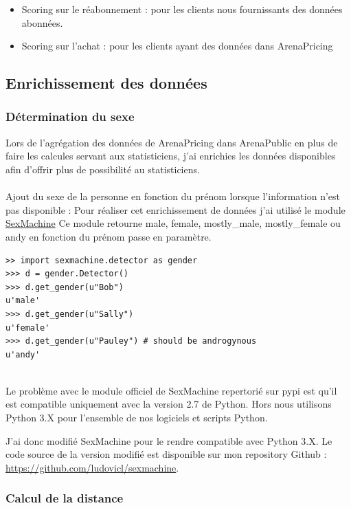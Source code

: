\begin{itemize}
  \item[\textbullet] Scoring sur le réabonnement : pour les clients nous fournissants des données abonnées. 
  \item[\textbullet] Scoring sur l'achat : pour les clients ayant des données dans ArenaPricing  
\end{itemize} 

\subsection{Enrichissement des données}
\subsubsection{Détermination du sexe}

Lors de l'agrégation des données de ArenaPricing dans ArenaPublic en plus de faire les calcules servant aux statisticiens, j'ai enrichies les données disponibles afin d'offrir plus de possibilité au statisticiens.
\\ \\
Ajout du sexe de la personne en fonction du prénom lorsque l'information n'est pas disponible :
Pour réaliser cet enrichissement de données j'ai utilisé le module 
\href{https://github.com/ferhatelmas/sexmachine/}{SexMachine}
Ce module retourne male, female, mostly\_male, mostly\_female ou andy en fonction du prénom passe en paramètre.

\lstset{style=custompython}
\begin{lstlisting}
>> import sexmachine.detector as gender
>>> d = gender.Detector()
>>> d.get_gender(u"Bob")
u'male'
>>> d.get_gender(u"Sally")
u'female'
>>> d.get_gender(u"Pauley") # should be androgynous
u'andy'
\end{lstlisting}
\leavevmode \\
Le problème avec le module officiel de SexMachine repertorié sur pypi est qu'il est compatible uniquement avec la version 2.7 de Python. Hors nous utilisons Python 3.X pour l'ensemble de nos logiciels et scripts Python. 

J'ai donc modifié SexMachine pour le rendre compatible avec Python 3.X. Le code source de la version modifié est disponible sur mon repository Github : \href{https://github.com/ludovicl/sexmachine}{https://github.com/ludovicl/sexmachine}.

\subsubsection{Calcul de la distance}

